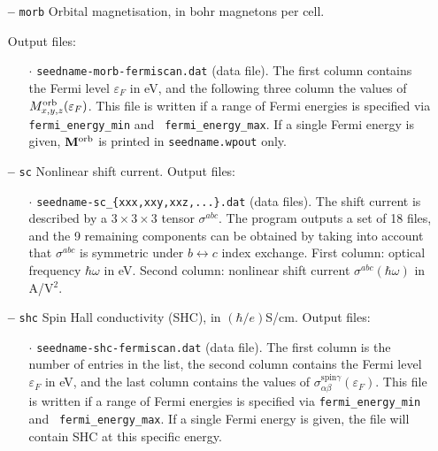 \begin{itemize}
\begin{itemize}
\end{itemize}

\item[{\bf --}] \verb#morb# Orbital magnetisation, in bohr magnetons
  per cell.

Output files:

\begin{itemize}

\item[$\cdot$] {\tt seedname-morb-fermiscan.dat} (data file). The
  first column contains the Fermi level $\varepsilon_F$ in eV, and the
  following three column the values of $M^{\rm
    orb}_{x,y,z}(\varepsilon_F)$.  This file is written if a range of
  Fermi energies is specified via {\tt fermi\_energy\_min} and {\tt
    fermi\_energy\_max}.  If a single Fermi energy is given, ${\bf
    M}^{\rm orb}$ is printed in {\tt seedname.wpout} only.

\end{itemize}

\item[{\bf --}] \verb#sc# Nonlinear shift current. Output files:

\begin{itemize}

\item[$\cdot$] {\tt seedname-sc\_{\{xxx,xxy,xxz,...\}.dat}}
  (data files).  The shift current is described by a $3\times3\times3$ tensor $\sigma^{abc}$. 
  The program outputs a set of 18 files, and the 9 remaining components 
  can be obtained by taking into account that $\sigma^{abc}$ is 
  symmetric under $b\leftrightarrow c$ index exchange.
  First column: optical frequency $\hbar\omega$ in
  eV. Second column: nonlinear shift current $\sigma^{abc}(\hbar\omega)$ in A/V$^{2}$. 
  
\end{itemize}


\item[{\bf --}] \verb#shc# Spin Hall conductivity (SHC), in $(\hbar/e)$S/cm.  Output files:

	\begin{itemize}
	
	\item[$\cdot$] {\tt seedname-shc-fermiscan.dat} (data file). The
	first column is the number of entries in the list, the second column contains the Fermi level $\varepsilon_F$ in eV, and the
	last column contains the values of
	$\sigma_{\alpha\beta}^{\text{spin}\gamma}(\varepsilon_F)$.  This file is written if a range of
	Fermi energies is specified via {\tt fermi\_energy\_min} and {\tt
		fermi\_energy\_max}.  If a single Fermi energy is given, the file will contain SHC at this specific energy.
	

\end{itemize}
\end{itemize}
